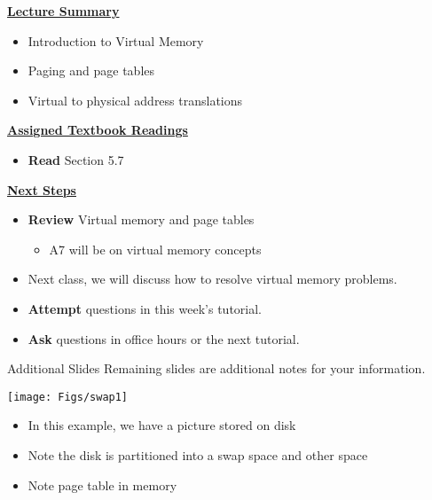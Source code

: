 \begin{frame}[fragile]
 \underline{\textbf{Lecture Summary}}
 \begin{itemize}
\item Introduction to Virtual Memory
\item Paging and page tables
\item Virtual to physical address translations
\end{itemize}

 \underline{\textbf{Assigned Textbook Readings}}
\begin{itemize}
   \item \textbf{Read} Section 5.7
     \end{itemize}
    \underline{\textbf{Next Steps}}
    \begin{itemize}
     \item \textbf{Review} Virtual memory and page tables
\begin{itemize}
    \item A7 will be on virtual memory concepts
\end{itemize}
\item Next class, we will discuss how to resolve virtual memory problems.
\item \textbf{Attempt} questions in this week's tutorial. 
    \item \textbf{Ask} questions in office hours or the next tutorial.
 \end{itemize}

\end{frame}

 \begin{frame}{Additional Slides}
     Remaining slides are additional notes for your information.
 \end{frame}



 \begin{frame}[fragile]
\centerline{\texttt{[image: Figs/swap1]}}
\BNotes\ifnum{}
\begin{itemize}
\item In this example, we have a picture stored on disk
\item Note the disk is partitioned into a swap space and other space
\item Note page table in memory
\end{itemize}
\fi\ENotes
\end{frame}

